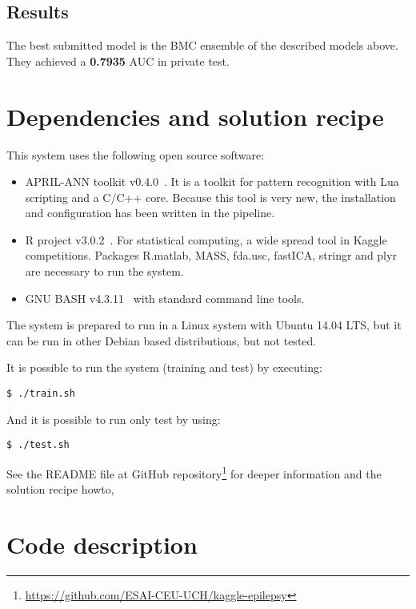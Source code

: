 \documentclass[a4paper,english,twoside]{article}
\begin{document}
\subsection{Results}\label{results}

The best submitted model is the BMC ensemble of the described models
above. They achieved a \textbf{0.7935} AUC in private test.

\section{Dependencies and solution recipe}\label{dependencies}

This system uses the following open source software:

\begin{itemize}
\item APRIL-ANN toolkit v0.4.0~\cite{aprilann}. It is a toolkit for pattern
  recognition with Lua scripting and a C/C++ core.  Because this tool is very
  new, the installation and configuration has been written in the pipeline.
\item R project v3.0.2~\cite{Rproject}. For statistical
  computing, a wide spread tool in Kaggle competitions. Packages
  R.matlab, MASS, fda.usc, fastICA, stringr and plyr are necessary to
  run the system.
\item GNU BASH v4.3.11~\cite{bash} with standard command line tools.
\end{itemize}

The system is prepared to run in a Linux system with Ubuntu 14.04 LTS, but it
can be run in other Debian based distributions, but not tested.

It is possible to run the system (training and test) by executing:

\begin{verbatim}
$ ./train.sh
\end{verbatim}

\noindent And it is possible to run only test by using:

\begin{verbatim}
$ ./test.sh
\end{verbatim}

See the README file at GitHub
repository\footnote{\url{https://github.com/ESAI-CEU-UCH/kaggle-epilepsy}} for
deeper information and the solution recipe howto,

\section{Code description}\label{code-description}
\end{document}
